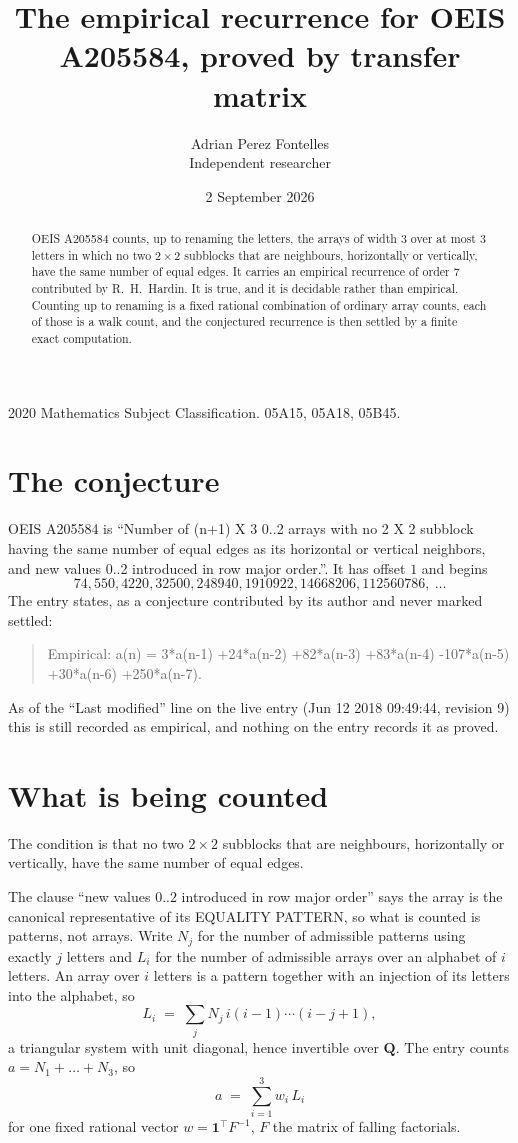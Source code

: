 \documentclass[11pt,a4paper]{article}
\title{The empirical recurrence for OEIS A205584, proved by transfer matrix}
\author{Adrian Perez Fontelles\\ \small Independent researcher}
\date{2 September 2026}
\theoremstyle{plain}
\theoremstyle{definition}
\begin{document}
\maketitle

\begin{abstract}
OEIS A205584 counts, up to renaming the letters, the arrays of width $3$ over at most $3$
letters in which no two $2\times2$ subblocks that are neighbours, horizontally or vertically, have the same number of equal edges. It carries an empirical recurrence of order $7$ contributed by
R.~H.~Hardin. It is true, and it is decidable rather than empirical. Counting up to renaming is
a fixed rational combination of ordinary array counts, each of those is a walk count, and the
conjectured recurrence is then settled by a finite exact computation.
\end{abstract}

\noindent\small 2020 Mathematics Subject Classification. 05A15, 05A18, 05B45.\normalsize

\section{The conjecture}

OEIS A205584 is ``Number of (n+1) X 3 0..2 arrays with no 2 X 2 subblock having the same number of equal edges as its horizontal or vertical neighbors, and new values 0..2 introduced in row major order.''. It has offset $1$ and begins
\[
74, 550, 4220, 32500, 248940, 1910922, 14668206, 112560786,\ \dots
\]
The entry states, as a conjecture contributed by its author and never marked settled:
\begin{quote}
Empirical: a(n) = 3*a(n-1) +24*a(n-2) +82*a(n-3) +83*a(n-4) -107*a(n-5) +30*a(n-6) +250*a(n-7).
\end{quote}
As of the ``Last modified'' line on the live entry (Jun 12 2018 09:49:44, revision 9) this is still
recorded as empirical, and nothing on the entry records it as proved.

\section{What is being counted}

The condition is that no two $2\times2$ subblocks that are neighbours, horizontally or vertically, have the same number of equal edges.

The clause ``new values $0..2$ introduced in row major order'' says the array is the
canonical representative of its EQUALITY PATTERN, so what is counted is patterns, not arrays.
Write $N_j$ for the number of admissible patterns using exactly $j$ letters and $L_i$ for the
number of admissible arrays over an alphabet of $i$ letters. An array over $i$ letters is a
pattern together with an injection of its letters into the alphabet, so
\[
L_i\;=\;\sum_j N_j\,i(i-1)\cdots(i-j+1),
\]
a triangular system with unit diagonal, hence invertible over $\mathbf{Q}$. The entry counts
$a=N_1+\dots+N_{3}$, so
\[
a\;=\;\sum_{i=1}^{3}w_i\,L_i
\]
for one fixed rational vector $w=\mathbf{1}^{\!\top}F^{-1}$, $F$ the matrix of falling
factorials.
\end{document}
